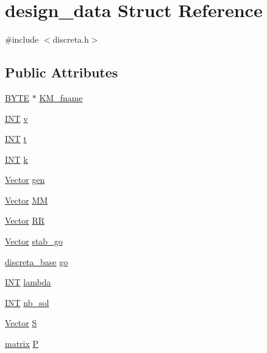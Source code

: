 \hypertarget{structdesign__data}{}\section{design\+\_\+data Struct Reference}
\label{structdesign__data}


{\ttfamily \#include $<$discreta.\+h$>$}

\subsection*{Public Attributes}
\begin{DoxyCompactItemize}
\item 
\mbox{\hyperlink{galois_8h_ab6cc7b4aeb6ea31aba2b3fbfc83ff5e6}{B\+Y\+TE}} $\ast$ \mbox{\hyperlink{structdesign__data_a4b44355de42617532cfdb84ebe5c0496}{K\+M\+\_\+fname}}
\item 
\mbox{\hyperlink{galois_8h_a09fddde158a3a20bd2dcadb609de11dc}{I\+NT}} \mbox{\hyperlink{structdesign__data_a067dd8092d3afae1bb9fd865b2993028}{v}}
\item 
\mbox{\hyperlink{galois_8h_a09fddde158a3a20bd2dcadb609de11dc}{I\+NT}} \mbox{\hyperlink{structdesign__data_a02dcd27aba385f21649421532fa70f29}{t}}
\item 
\mbox{\hyperlink{galois_8h_a09fddde158a3a20bd2dcadb609de11dc}{I\+NT}} \mbox{\hyperlink{structdesign__data_a542719aef16023425c3ab1ca8e0d7e7a}{k}}
\item 
\mbox{\hyperlink{class_vector}{Vector}} \mbox{\hyperlink{structdesign__data_a348dd91c0cd881cdf7916dd110753f5c}{gen}}
\item 
\mbox{\hyperlink{class_vector}{Vector}} \mbox{\hyperlink{structdesign__data_a7714a4b926299616f706a04228781bcc}{MM}}
\item 
\mbox{\hyperlink{class_vector}{Vector}} \mbox{\hyperlink{structdesign__data_ad704599ce77640b50f109f85f56ec9de}{RR}}
\item 
\mbox{\hyperlink{class_vector}{Vector}} \mbox{\hyperlink{structdesign__data_a8d3d423c67401a5e1aa84b9fbb01bd15}{stab\+\_\+go}}
\item 
\mbox{\hyperlink{classdiscreta__base}{discreta\+\_\+base}} \mbox{\hyperlink{structdesign__data_a9ecb271f64a4d1b2d42de3d13ffc106b}{go}}
\item 
\mbox{\hyperlink{galois_8h_a09fddde158a3a20bd2dcadb609de11dc}{I\+NT}} \mbox{\hyperlink{structdesign__data_ae94429660e53f332f7617df97b0957fb}{lambda}}
\item 
\mbox{\hyperlink{galois_8h_a09fddde158a3a20bd2dcadb609de11dc}{I\+NT}} \mbox{\hyperlink{structdesign__data_a94e302031324f09a9f63d73beb7d4831}{nb\+\_\+sol}}
\item 
\mbox{\hyperlink{class_vector}{Vector}} \mbox{\hyperlink{structdesign__data_abe017c74acd9d051c9aec7e4c9c9b9bd}{S}}
\item 
\mbox{\hyperlink{classmatrix}{matrix}} \mbox{\hyperlink{structdesign__data_a57c4a70becff9fec435ec169cc5acfe4}{P}}
\end{DoxyCompactItemize}


